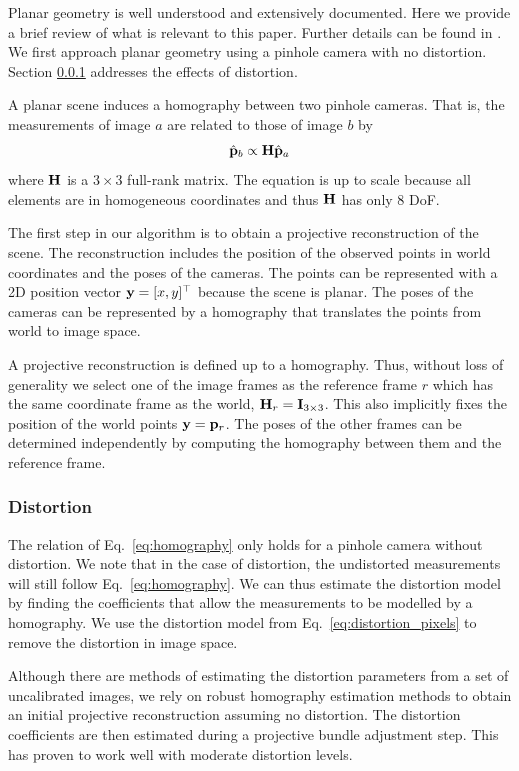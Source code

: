 \documentclass[10pt,twocolumn,letterpaper]{article}
\begin{document}
Planar geometry is well understood and extensively documented. Here we provide a brief review of what is relevant to this paper. Further details can be found in \cite{hartley2000}. We first approach planar geometry using a pinhole camera with no distortion. Section \ref{sec:planar:distortion} addresses the effects of distortion.

A planar scene induces a homography between two pinhole cameras. That is, the measurements of image $a$ are related to those of image $b$ by
%
\begin{align}
\hat{\mathbf{p}}_b \propto \mathbf{H} \hat{\mathbf{p}}_a 
\label{eq:homography}
\end{align}
%
where $\mathbf{H}$ is a $3 \times 3$ full-rank matrix. The equation is up to scale because all elements are in homogeneous coordinates and thus $\mathbf{H}$ has only 8 DoF.

The first step in our algorithm is to obtain a projective reconstruction of the scene. The reconstruction includes the position of the observed points in world coordinates and the poses of the cameras. The points can be represented with a 2D position vector $\mathbf{y}=[x,y]^\top$ because the scene is planar. The poses of the cameras can be represented by a homography that translates the points from world to image space. 

A projective reconstruction is defined up to a homography. Thus, without loss of generality we select one of the image frames as the reference frame $r$ which has the same coordinate frame as the world, \ie $\mathbf{H}_r = \mathbf{I}_{3 \times 3}$. This also implicitly fixes the position of the world points $\mathbf{y}=\mathbf{p}_r$. The poses of the other frames can be determined independently by computing the homography between them and the reference frame.

\subsubsection{Distortion}
\label{sec:planar:distortion}

The relation of Eq.~\eqref{eq:homography} only holds for a pinhole camera without distortion. We note that in the case of distortion, the undistorted measurements will still follow Eq.~\eqref{eq:homography}. We can thus estimate the distortion model by finding the coefficients that allow the measurements to be modelled by a homography. We use the distortion model from Eq.~\eqref{eq:distortion_pixels} to remove the distortion in image space.

Although there are methods of estimating the distortion parameters from a set of uncalibrated images, we rely on robust homography estimation methods \cite{hartley2000} to obtain an initial projective reconstruction assuming no distortion. The distortion coefficients are then estimated during a projective bundle adjustment step. This has proven to work well with moderate distortion levels.
\end{document}
